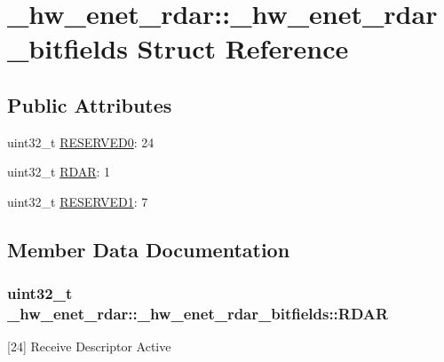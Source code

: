 \hypertarget{struct__hw__enet__rdar_1_1__hw__enet__rdar__bitfields}{}\section{\+\_\+hw\+\_\+enet\+\_\+rdar\+:\+:\+\_\+hw\+\_\+enet\+\_\+rdar\+\_\+bitfields Struct Reference}
\label{struct__hw__enet__rdar_1_1__hw__enet__rdar__bitfields}
\subsection*{Public Attributes}
\begin{DoxyCompactItemize}
\item 
uint32\+\_\+t \hyperlink{struct__hw__enet__rdar_1_1__hw__enet__rdar__bitfields_a0280ec6f5c8ededf0dacab6e129b2ea9}{R\+E\+S\+E\+R\+V\+E\+D0}\+: 24
\item 
uint32\+\_\+t \hyperlink{struct__hw__enet__rdar_1_1__hw__enet__rdar__bitfields_ad0d316f41f5df2f9c125346e5edda481}{R\+D\+AR}\+: 1
\item 
uint32\+\_\+t \hyperlink{struct__hw__enet__rdar_1_1__hw__enet__rdar__bitfields_afb293b1a0c3be4bfe21d1f8731fc7791}{R\+E\+S\+E\+R\+V\+E\+D1}\+: 7
\end{DoxyCompactItemize}


\subsection{Member Data Documentation}
\subsubsection[{\texorpdfstring{R\+D\+AR}{RDAR}}]{\setlength{\rightskip}{0pt plus 5cm}uint32\+\_\+t \+\_\+hw\+\_\+enet\+\_\+rdar\+::\+\_\+hw\+\_\+enet\+\_\+rdar\+\_\+bitfields\+::\+R\+D\+AR}\hypertarget{struct__hw__enet__rdar_1_1__hw__enet__rdar__bitfields_ad0d316f41f5df2f9c125346e5edda481}{}\label{struct__hw__enet__rdar_1_1__hw__enet__rdar__bitfields_ad0d316f41f5df2f9c125346e5edda481}
\mbox{[}24\mbox{]} Receive Descriptor Active 
